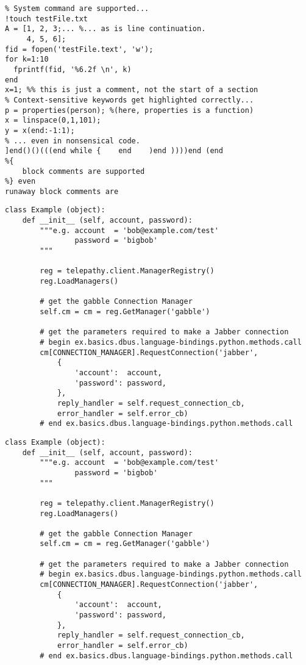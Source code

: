 \begin{lstlisting}[style=Matlab, caption={ejemplo código Matlab en blanco y negro},label=Matlab_codebn]
%% Code sections are highlighted.
% System command are supported...
!touch testFile.txt
A = [1, 2, 3;... %... as is line continuation.
     4, 5, 6];
fid = fopen('testFile.text', 'w');
for k=1:10
  fprintf(fid, '%6.2f \n', k)
end
x=1; %% this is just a comment, not the start of a section
% Context-sensitive keywords get highlighted correctly...
p = properties(person); %(here, properties is a function)
x = linspace(0,1,101);
y = x(end:-1:1);
% ... even in nonsensical code.
]end()()(((end while {    end    )end ))))end (end
%{
    block comments are supported
%} even
runaway block comments are
\end{lstlisting}
\newpage
\begin{lstlisting}[style=Python-color, caption={ejemplo código Python en color}]
class Example (object):
    def __init__ (self, account, password):
        """e.g. account  = 'bob@example.com/test'
                password = 'bigbob'
        """

        reg = telepathy.client.ManagerRegistry()
        reg.LoadManagers()

        # get the gabble Connection Manager
        self.cm = cm = reg.GetManager('gabble')

        # get the parameters required to make a Jabber connection
        # begin ex.basics.dbus.language-bindings.python.methods.call
        cm[CONNECTION_MANAGER].RequestConnection('jabber',
            {
                'account':  account,
                'password': password,
            },
            reply_handler = self.request_connection_cb,
            error_handler = self.error_cb)
        # end ex.basics.dbus.language-bindings.python.methods.call
\end{lstlisting}

\begin{lstlisting}[style=Python, caption={ejemplo código Python en blanco y negro}]
class Example (object):
    def __init__ (self, account, password):
        """e.g. account  = 'bob@example.com/test'
                password = 'bigbob'
        """

        reg = telepathy.client.ManagerRegistry()
        reg.LoadManagers()

        # get the gabble Connection Manager
        self.cm = cm = reg.GetManager('gabble')

        # get the parameters required to make a Jabber connection
        # begin ex.basics.dbus.language-bindings.python.methods.call
        cm[CONNECTION_MANAGER].RequestConnection('jabber',
            {
                'account':  account,
                'password': password,
            },
            reply_handler = self.request_connection_cb,
            error_handler = self.error_cb)
        # end ex.basics.dbus.language-bindings.python.methods.call
\end{lstlisting}

